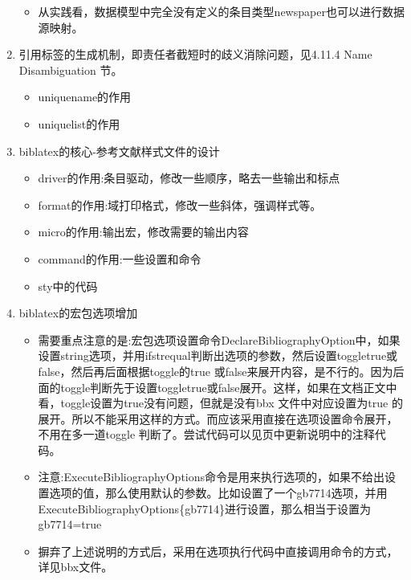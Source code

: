 \begin{enumerate}
\begin{itemize}
      \item 从实践看，数据模型中完全没有定义的条目类型newspaper也可以进行数据源映射。
      \end{itemize}

  \item 引用标签的生成机制，即责任者截短时的歧义消除问题，见4.11.4 Name Disambiguation 节。
  \begin{itemize}
    \item uniquename的作用
    \item uniquelist的作用
  \end{itemize}

  \item biblatex的核心-参考文献样式文件的设计
  \begin{itemize}
    \item driver的作用:条目驱动，修改一些顺序，略去一些输出和标点
    \item format的作用:域打印格式，修改一些斜体，强调样式等。
    \item micro的作用:输出宏，修改需要的输出内容
    \item command的作用:一些设置和命令
    \item sty中的代码
  \end{itemize}

  \item biblatex的宏包选项增加
  \begin{itemize}
    \item 需要重点注意的是:宏包选项设置命令DeclareBibliographyOption中，如果设置string选项，并用ifstrequal判断出选项的参数，然后设置toggletrue或false，然后再后面根据toggle的true 或false来展开内容，是不行的。因为后面的toggle判断先于设置toggletrue或false展开。这样，如果在文档正文中看，toggle设置为true没有问题，但就是没有bbx 文件中对应设置为true 的展开。所以不能采用这样的方式。而应该采用直接在选项设置命令展开，不用在多一道toggle 判断了。尝试代码可以见\pageref{up:161207}页中更新说明中的注释代码。
    \item 注意:ExecuteBibliographyOptions命令是用来执行选项的，如果不给出设置选项的值，那么使用默认的参数。比如设置了一个gb7714选项，并用ExecuteBibliographyOptions\{gb7714\}进行设置，那么相当于设置为gb7714=true
    \item 摒弃了上述说明的方式后，采用在选项执行代码中直接调用命令的方式，详见bbx文件。
  \end{itemize}


\end{enumerate}
